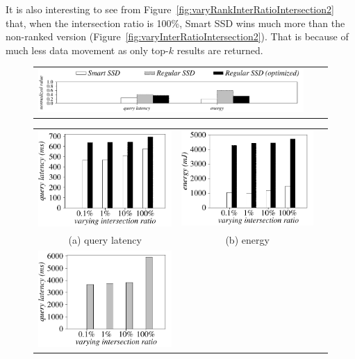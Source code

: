 It is also interesting to see from Figure~\ref{fig:varyRankInterRatioIntersection2} that, when the intersection ratio is 100\%, Smart SSD wins much more than the non-ranked version (Figure~\ref{fig:varyInterRatioIntersection2}). That is because of much less data movement as only top-$k$ results are returned.


  \begin{figure}[tbp]
  \centering
    \begin{tabular}{ccc}
 \includegraphics[width=0.95\columnwidth]{figures/banner.pdf}
\end{tabular}
\renewcommand{\tabcolsep}{0.1mm}
  \begin{tabular}{ccc}
 \includegraphics[width=0.5\columnwidth]{figures/RankIntersection-time-VaryInterRatio-equal2-eps-converted-to.pdf}&
  \includegraphics[width=0.5\columnwidth]{figures/RankIntersection-energy-VaryInterRatio-equal2-eps-converted-to.pdf}\\
  (a) query latency & (b) energy\\
   \includegraphics[width=0.5\columnwidth]{figures/RankIntersection-time-VaryInterRatio-equal1-eps-converted-to.pdf}&

\end{tabular}
\end{figure}
